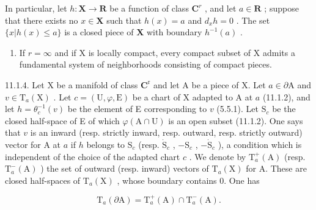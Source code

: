 In particular, let \(h: \mathbf{X} \to \mathbf{R}\) be a function of class \(\mathbf{C}^r\) , and let \(a \in \mathbf{R}\) ; suppose that there exists no \(x \in \mathbf{X}\) such that \(h(x) = a\) and \(d_x h = 0\) . The set \(\{x | h(x) \leqslant a\}\) is a closed piece of \(\mathbf{X}\) with boundary \(h^{-1}(a)\) .

\begin{enumerate}
\def\labelenumi{\alph{enumi})}
\setcounter{enumi}{3}
\tightlist
\item
  If \(r = \infty\) and if X is locally compact, every compact subset of X admits a fundamental system of neighborhoods consisting of compact pieces.
\end{enumerate}

11.1.4. Let X be a manifold of class \(\mathbf{C}^{\mathrm{r}}\) and let A be a piece of X. Let \(a \in \partial \mathrm{A}\) and \(v \in \mathrm{T}_a(\mathrm{X})\) . Let \(c = (\mathrm{U}, \varphi, \mathrm{E})\) be a chart of X adapted to A at \(a\) (11.1.2), and let \(h = \theta_c^{-1}(v)\) be the element of E corresponding to \(v\) (5.5.1). Let \(\mathrm{S}_c\) be the closed half-space of E of which \(\varphi(\mathrm{A} \cap \mathrm{U})\) is an open subset (11.1.2). One says that \(v\) is an inward (resp. strictly inward, resp. outward, resp. strictly outward) vector for A at \(a\) if \(h\) belongs to \(\mathrm{S}_c\) (resp. \(\dot{\mathrm{S}}_c\) , \(-\mathrm{S}_c\) , \(-\dot{\mathrm{S}}_c\) ), a condition which is independent of the choice of the adapted chart \(c\) . We denote by \(\mathrm{T}_a^+(\mathrm{A})\) (resp. \(\mathrm{T}_a^-(\mathrm{A})\) ) the set of outward (resp. inward) vectors of \(\mathrm{T}_a(\mathrm{X})\) for A. These are closed half-spaces of \(\mathrm{T}_a(\mathrm{X})\) , whose boundary contains 0. One has

\[
\mathrm{T} _ {a} (\partial \mathrm{A}) = \mathrm{T} _ {a} ^ {+} (\mathrm{A}) \cap \mathrm{T} _ {a} ^ {-} (\mathrm{A}).
\]

